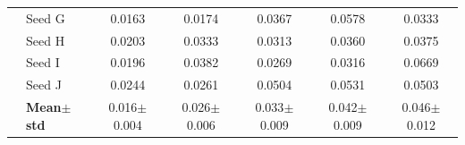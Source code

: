 \begin{table}[H]
{\begin{tabular}{@{}llccccc@{}}
  & Seed G & {\small 0.0163} & {\small 0.0174} & {\small 0.0367} & {\small 0.0578} & {\small 0.0333} \\
  & Seed H & {\small 0.0203} & {\small 0.0333} & {\small 0.0313} & {\small 0.0360} & {\small 0.0375} \\
  & Seed I & {\small 0.0196} & {\small 0.0382} & {\small 0.0269} & {\small 0.0316} & {\small 0.0669} \\
  & Seed J & {\small 0.0244} & {\small 0.0261} & {\small 0.0504} & {\small 0.0531} & {\small 0.0503} \\
 & \textbf{Mean$\pm$std} & \cellcolor{ForestGreen!25}0.016$\pm$0.004 & \cellcolor{ForestGreen!25}0.026$\pm$0.006 & \cellcolor{ForestGreen!25}0.033$\pm$0.009 & \cellcolor{ForestGreen!25}0.042$\pm$0.009 & \cellcolor{ForestGreen!25}0.046$\pm$0.012 \\
\bottomrule
\end{tabular}
}
\end{table}

